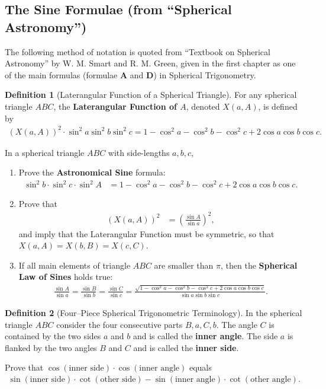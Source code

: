 \documentclass[12pt,a4paper]{memoir}
\theoremstyle{definition}
\newtheorem*{definition}{Definition}
\begin{document}
\subsection{The Sine Formulae (from ``Spherical Astronomy'')}
	The following method of notation is quoted from ``Textbook on Spherical Astronomy'' by W. M. Smart and R. M. Green, given in the first chapter as one of the main formulas (formulae \textbf{A} and \textbf{D}) in Spherical Trigonometry.%
	\begin{definition}[Laterangular Function of a Spherical Triangle]
		For any spherical triangle $ABC$, the \textbf{Laterangular Function of $A$}, denoted $X(a,A)$, is defined by
		\begin{align*}
			\left(X(a,A)\right)^2\cdot \sin^2 a \sin^2 b \sin^2 c = 1- \cos^2 a -\cos^2 b -\cos^2 c + 2\cos a \cos b \cos c.
		\end{align*}
	\end{definition}
	\begin{question}
		In a spherical triangle $ABC$ with side-lengths $a,b,c$,
		\begin{enumerate}
			\item  Prove the \textbf{Astronomical Sine} formula:
			\begin{align*}
				\sin^2 b \cdot \sin^2 c \cdot \sin^2 A &= 1- \cos^2 a -\cos^2 b - \cos^2 c + 2\cos a \cos b \cos c.
			\end{align*}
			\item Prove that
			\begin{align*}
				\left(X(a,A)\right)^2 &= \left(\frac{\sin A}{\sin a}\right)^2,
			\end{align*}
			and imply that the Laterangular Function must be symmetric, so that $X(a,A) = X(b,B) = X(c,C)$.
			\item If all main elements of triangle $ABC$ are smaller than $\pi$, then the \textbf{Spherical Law of Sines} holds true:
			\begin{align*}
				\frac{\sin A}{\sin a} =  \frac{\sin B}{\sin b} = \frac{\sin C}{\sin c} = \frac{\sqrt{ 1- \cos^2 a -\cos^2 b - \cos^2 c + 2\cos a \cos b \cos c}}{\sin a \sin b \sin c}.
			\end{align*}
		\end{enumerate}
	\end{question}
	\begin{definition}[Four--Piece Spherical Trigonometric Terminology]
		In the spherical triangle $ABC$ consider the four consecutive parts $B,a,C,b$. The angle $C$ is contained by the two sides $a$ and $b$ and is called the \textbf{inner angle}. The side $a$ is flanked by the two angles $B$ and $C$ and is called the \textbf{inner side}.
	\end{definition}
	\begin{question}[name={Four-Part Identity}]
		Prove that $\cos(\text{inner side})\cdot \cos(\text{inner angle})$ equals
		\begin{align*}
			\sin(\text{inner side})\cdot \cot(\text{other side}) - \sin(\text{inner angle})\cdot \cot(\text{other angle}).
		\end{align*}
	\end{question}    
\end{document}
